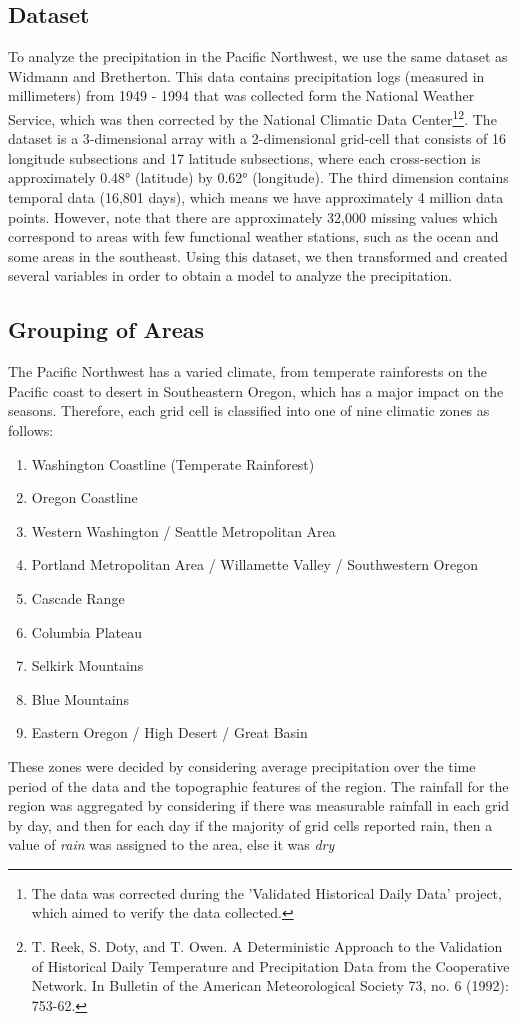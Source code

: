 \documentclass{article}
\begin{document}
\subsection{Dataset}
To analyze the precipitation in the Pacific Northwest, we use the same dataset as Widmann and Bretherton. This data contains precipitation logs (measured in millimeters) from 1949 - 1994 that was collected form the National Weather Service, which was then corrected by the National Climatic Data Center\footnote{The data was corrected during the 'Validated Historical Daily Data' project, which aimed to verify the data collected.}\footnote{T. Reek, S. Doty, and T. Owen. A Deterministic Approach to the Validation of Historical Daily Temperature and Precipitation Data from the Cooperative Network. In Bulletin of the American Meteorological Society 73, no. 6 (1992): 753-62.}. The dataset is a 3-dimensional array with a 2-dimensional grid-cell that consists of 16 longitude subsections and 17 latitude subsections, where each cross-section is approximately \ang{0.48} (latitude) by \ang{0.62} (longitude). The third dimension contains temporal data (16,801 days), which means we have approximately 4 million data points. However, note that there are approximately 32,000 missing values which correspond to areas with few functional weather stations, such as the ocean and some areas in the southeast. Using this dataset, we then transformed and created several variables in order to obtain a model to analyze the precipitation. 

\subsection{Grouping of Areas} \label{GroupArea}
The Pacific Northwest has a varied climate, from temperate rainforests on the Pacific coast to desert in Southeastern Oregon, which has a major impact on the seasons. Therefore, each grid cell is classified into one of nine climatic zones as follows:
\begin{enumerate}
\item Washington Coastline (Temperate Rainforest)
\item Oregon Coastline
\item Western Washington / Seattle Metropolitan Area
\item Portland Metropolitan Area / Willamette Valley / Southwestern Oregon
\item Cascade Range
\item Columbia Plateau
\item Selkirk Mountains
\item Blue Mountains
\item Eastern Oregon / High Desert / Great Basin
\end{enumerate}
These zones were decided by considering average precipitation over the time period of the data and the topographic features of the region. The rainfall for the region was aggregated by considering if there was measurable rainfall in each grid by day, and then for each day if the majority of grid cells reported rain, then a value of \textit{rain} was assigned to the area, else it was \textit{dry}
\end{document}
